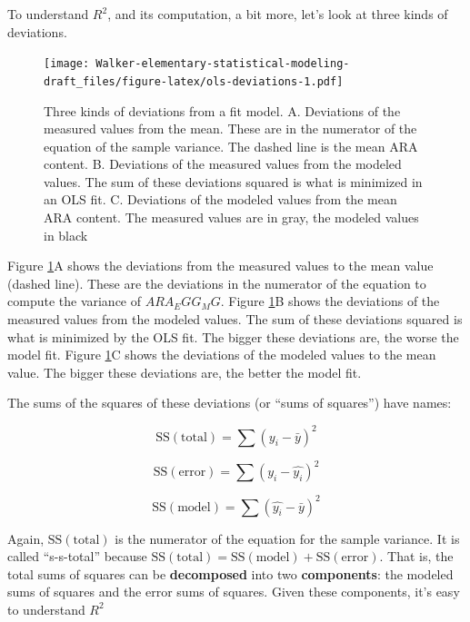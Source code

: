 \documentclass[]{book}
\begin{document}
To understand \(R^2\), and its computation, a bit more, let's look at
three kinds of deviations.

\begin{figure}
\centering
\texttt{[image: Walker-elementary-statistical-modeling-draft\_files/figure-latex/ols-deviations-1.pdf]}
\caption{\label{fig:ols-deviations}Three kinds of deviations from a fit
model. A. Deviations of the measured values from the mean. These are in
the numerator of the equation of the sample variance. The dashed line is
the mean ARA content. B. Deviations of the measured values from the
modeled values. The sum of these deviations squared is what is minimized
in an OLS fit. C. Deviations of the modeled values from the mean ARA
content. The measured values are in gray, the modeled values in black}
\end{figure}

Figure \ref{fig:ols-deviations}A shows the deviations from the measured
values to the mean value (dashed line). These are the deviations in the
numerator of the equation to compute the variance of \(ARA_EGG_MG\).
Figure \ref{fig:ols-deviations}B shows the deviations of the measured
values from the modeled values. The sum of these deviations squared is
what is minimized by the OLS fit. The bigger these deviations are, the
worse the model fit. Figure \ref{fig:ols-deviations}C shows the
deviations of the modeled values to the mean value. The bigger these
deviations are, the better the model fit.

The sums of the squares of these deviations (or ``sums of squares'')
have names:

\begin{equation}
\mathrm{SS(total)} = \sum{(y_i - \bar{y})^2}
\end{equation}

\begin{equation}
\mathrm{SS(error)} = \sum{(y_i - \hat{y_i})^2}
\end{equation}

\begin{equation}
\mathrm{SS(model)} = \sum{(\hat{y_i} - \bar{y})^2}
\end{equation}

Again, \(\mathrm{SS(total)}\) is the numerator of the equation for the
sample variance. It is called ``s-s-total'' because
\(\mathrm{SS(total)} = \mathrm{SS(model)} + \mathrm{SS(error)}\). That
is, the total sums of squares can be \textbf{decomposed} into two
\textbf{components}: the modeled sums of squares and the error sums of
squares. Given these components, it's easy to understand \(R^2\)
\end{document}
